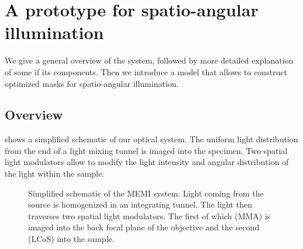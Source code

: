 
\newcommand{\imagw}[3]{
  \begin{figure}[!hbt]
    \centering
    \texttt{[image: \#2]}
    \caption{#3}
    \label{fig:#2}
  \end{figure}
}

\newcommand{\imag}[2]{\imagw{16cm}{#1}{#2}}

\chapter{A prototype for spatio-angular illumination}
\label{sec:setup}
\begin{summary}
  We give a general overview of the system, followed by more detailed
  explanation of some if its components. Then we introduce a model
  that allows to construct optimized masks for spatio-angular
  illumination.
\end{summary}

\section{Overview}



 shows a simplified schematic of our optical
system. The uniform light distribution from the end of a light mixing
tunnel is imaged into the specimen. Two spatial light modulators allow
to modify the light intensity and angular distribution of the light
within the sample.

\begin{figure}[!hbt]
  \centering
  \def\svgscale{1.5}
  
  \caption{Simplified schematic of the MEMI system. Light coming from
    the source is homogenized in an integrating tunnel. The light then
    traverses two spatial light modulators. The first of which (MMA)
    is imaged into the back focal plane of the objective and the
    second (LCoS) into the sample.}
  \label{fig:memi-simple}
\end{figure}

